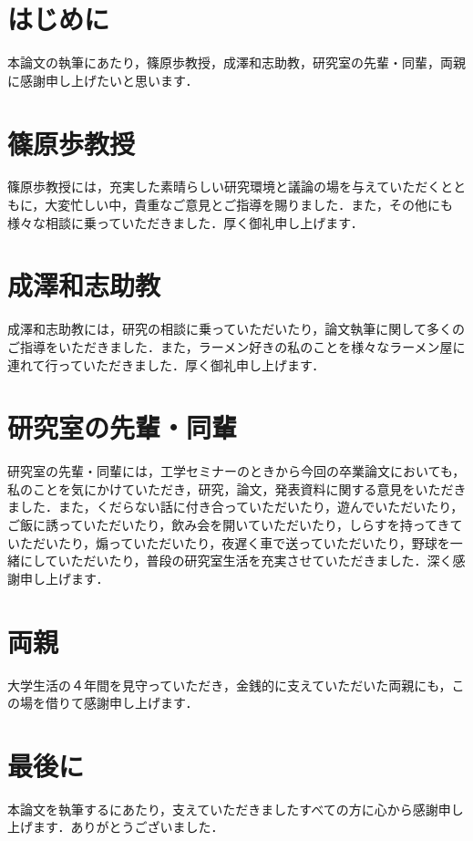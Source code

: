 \section*{はじめに}
本論文の執筆にあたり，篠原歩教授，成澤和志助教，研究室の先輩・同輩，両親に感謝申し上げたいと思います．
\section*{篠原歩教授}
篠原歩教授には，充実した素晴らしい研究環境と議論の場を与えていただくとともに，大変忙しい中，貴重なご意見とご指導を賜りました．また，その他にも様々な相談に乗っていただきました．厚く御礼申し上げます．
\section*{成澤和志助教}
成澤和志助教には，研究の相談に乗っていただいたり，論文執筆に関して多くのご指導をいただきました．また，ラーメン好きの私のことを様々なラーメン屋に連れて行っていただきました．厚く御礼申し上げます．
\section*{研究室の先輩・同輩}
研究室の先輩・同輩には，工学セミナーのときから今回の卒業論文においても，私のことを気にかけていただき，研究，論文，発表資料に関する意見をいただきました．また，くだらない話に付き合っていただいたり，遊んでいただいたり，ご飯に誘っていただいたり，飲み会を開いていただいたり，しらすを持ってきていただいたり，煽っていただいたり，夜遅く車で送っていただいたり，野球を一緒にしていただいたり，普段の研究室生活を充実させていただきました．深く感謝申し上げます．
\section*{両親}
大学生活の４年間を見守っていただき，金銭的に支えていただいた両親にも，この場を借りて感謝申し上げます．
\section*{最後に}
本論文を執筆するにあたり，支えていただきましたすべての方に心から感謝申し上げます．ありがとうございました．